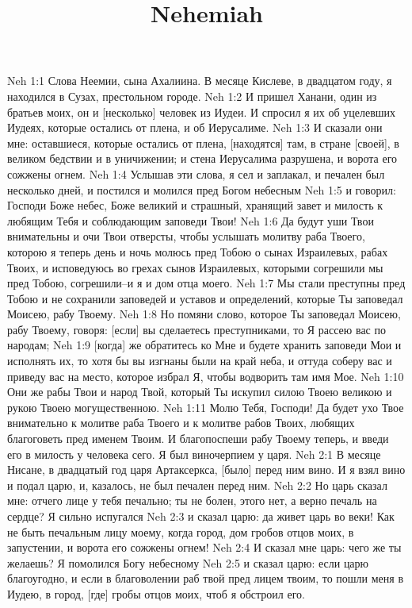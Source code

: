 

\title{Nehemiah}

Neh 1:1  Слова Неемии, сына Ахалиина. В месяце Кислеве, в двадцатом году, я находился в Сузах, престольном городе.
Neh 1:2  И пришел Ханани, один из братьев моих, он и [несколько] человек из Иудеи. И спросил я их об уцелевших Иудеях, которые остались от плена, и об Иерусалиме.
Neh 1:3  И сказали они мне: оставшиеся, которые остались от плена, [находятся] там, в стране [своей], в великом бедствии и в уничижении; и стена Иерусалима разрушена, и ворота его сожжены огнем.
Neh 1:4  Услышав эти слова, я сел и заплакал, и печален был несколько дней, и постился и молился пред Богом небесным
Neh 1:5  и говорил: Господи Боже небес, Боже великий и страшный, хранящий завет и милость к любящим Тебя и соблюдающим заповеди Твои!
Neh 1:6  Да будут уши Твои внимательны и очи Твои отверсты, чтобы услышать молитву раба Твоего, которою я теперь день и ночь молюсь пред Тобою о сынах Израилевых, рабах Твоих, и исповедуюсь во грехах сынов Израилевых, которыми согрешили мы пред Тобою, согрешили--и я и дом отца моего.
Neh 1:7  Мы стали преступны пред Тобою и не сохранили заповедей и уставов и определений, которые Ты заповедал Моисею, рабу Твоему.
Neh 1:8  Но помяни слово, которое Ты заповедал Моисею, рабу Твоему, говоря: [если] вы сделаетесь преступниками, то Я рассею вас по народам;
Neh 1:9  [когда] же обратитесь ко Мне и будете хранить заповеди Мои и исполнять их, то хотя бы вы изгнаны были на край неба, и оттуда соберу вас и приведу вас на место, которое избрал Я, чтобы водворить там имя Мое.
Neh 1:10  Они же рабы Твои и народ Твой, который Ты искупил силою Твоею великою и рукою Твоею могущественною.
Neh 1:11  Молю Тебя, Господи! Да будет ухо Твое внимательно к молитве раба Твоего и к молитве рабов Твоих, любящих благоговеть пред именем Твоим. И благопоспеши рабу Твоему теперь, и введи его в милость у человека сего. Я был виночерпием у царя.
Neh 2:1  В месяце Нисане, в двадцатый год царя Артаксеркса, [было] перед ним вино. И я взял вино и подал царю, и, казалось, не был печален перед ним.
Neh 2:2  Но царь сказал мне: отчего лице у тебя печально; ты не болен, этого нет, а верно печаль на сердце? Я сильно испугался
Neh 2:3  и сказал царю: да живет царь во веки! Как не быть печальным лицу моему, когда город, дом гробов отцов моих, в запустении, и ворота его сожжены огнем!
Neh 2:4  И сказал мне царь: чего же ты желаешь? Я помолился Богу небесному
Neh 2:5  и сказал царю: если царю благоугодно, и если в благоволении раб твой пред лицем твоим, то пошли меня в Иудею, в город, [где] гробы отцов моих, чтоб я обстроил его.
